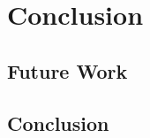 \chapter{Conclusion}
\label{chapter:conclusion}

\section{Future Work}

\section{Conclusion}







